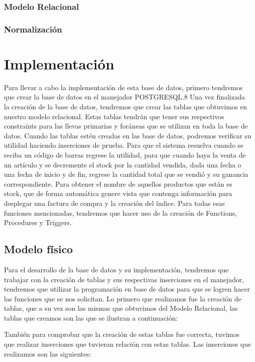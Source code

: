 \documentclass[12pt,letterpaper]{article}
\begin{document}
			\subsubsection{Modelo Relacional}
			
			\subsubsection{Normalización}
		
	\section{Implementación}
		Para llevar a cabo la implementación de esta base de datos, primero tendremos que crear la base de datos en el manejador POSTGRESQL.8 Una vez finalizada la creación de la base de datos, tendremos que crear las tablas que obtuvimos en nuestro modelo relacional. Estas tablas tendrán que tener sus respectivos constraints para las
		llevas primarias y foráneas que se utilizan en toda la base de datos. Cuando las tablas estén creadas en las base de datos, podremos verificar su utilidad haciendo
		inserciones de prueba. Para que el sistema resuelva cuando se reciba un código de barras regrese la utilidad, para que cuando haya la venta de un artículo y se decremente el stock por la cantidad vendida, dada una fecha o una fecha de inicio y de fin, regrese la cantidad total que se vendió y su ganancia correspondiente. Para obtener el nombre de aquellos productos que están es stock, que de forma	automática genere vista que contenga información para desplegar una factura de compra y la creación del índice. Para todas esas funciones mencionadas, tendremos que hacer uso de la creación de Functions, Procedures y Triggers.
		
		\subsection{Modelo físico}
			Para el desarrollo de la base de datos y su implementación, tendremos que trabajar con la creación de tablas y sus respectivas inserciones en el manejador, tendremos que utilizar la programación en base de datos para que se logren hacer las funciones que se nos solicitan. Lo primero que realizamos fue la creación de tablas, que a su vez son las mismas que obtuvimos del Modelo Relacional, las tablas que creamos son las que se ilustran a continuación:
		
		
		También para comprobar que la creación de estas tablas fue correcta, tuvimos que realizar inserciones que tuvieran relación con estas tablas. Las inserciones que realizamos son las siguientes:
		
\end{document}
